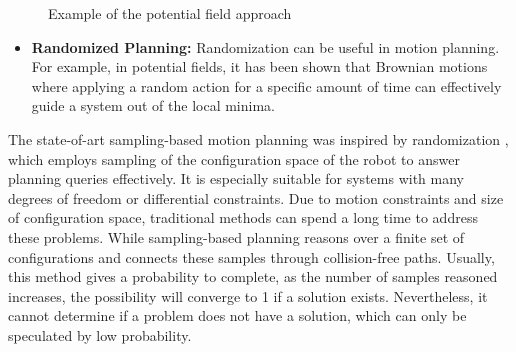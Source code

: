 \begin{figure}[H]
\centering
{}
\caption{Example of the potential field approach}
\label{potentialexample}
\end{figure}

\begin{itemize}
    \item \textbf{Randomized Planning:} Randomization can be useful in motion planning. For example, in potential fields, it has been shown that Brownian motions where applying a random action for a specific amount of time can effectively guide a system out of the local minima.
\end{itemize}

The state-of-art sampling-based motion planning was inspired by randomization \citep{OMPLPrim20:online}, which employs sampling of the configuration space of the robot to answer planning queries effectively. It is especially suitable for systems with many degrees of freedom or differential constraints. Due to motion constraints and size of configuration space, traditional methods can spend a long time to address these problems. While sampling-based planning reasons over a finite set of configurations and connects these samples through collision-free paths. Usually, this method gives a probability to complete, as the number of samples reasoned increases, the possibility will converge to 1 if a solution exists. Nevertheless, it cannot determine if a problem does not have a solution, which can only be speculated by low probability. 

